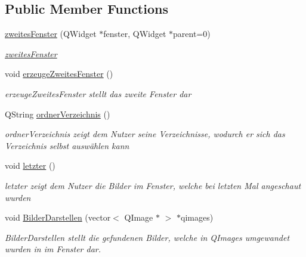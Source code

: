 \subsection*{Public Member Functions}
\begin{DoxyCompactItemize}
\item 
\hyperlink{classzweites_fenster_abd42b9f9eda9e42c44dcfa27e3fd11c3}{zweites\+Fenster} (Q\+Widget $\ast$fenster, Q\+Widget $\ast$parent=0)
\begin{DoxyCompactList}\small\item\em \hyperlink{classzweites_fenster}{zweites\+Fenster} \end{DoxyCompactList}\item 
void \hyperlink{classzweites_fenster_acdfb3797a369e96d2680b2d8ca97521b}{erzeuge\+Zweites\+Fenster} ()\hypertarget{classzweites_fenster_acdfb3797a369e96d2680b2d8ca97521b}{}\label{classzweites_fenster_acdfb3797a369e96d2680b2d8ca97521b}

\begin{DoxyCompactList}\small\item\em erzeuge\+Zweites\+Fenster stellt das zweite Fenster dar \end{DoxyCompactList}\item 
Q\+String \hyperlink{classzweites_fenster_a2bc52fa49362345f9f06e1826d417c6b}{ordner\+Verzeichnis} ()
\begin{DoxyCompactList}\small\item\em ordner\+Verzeichnis zeigt dem Nutzer seine Verzeichnisse, wodurch er sich das Verzeichnis selbst auswählen kann \end{DoxyCompactList}\item 
void \hyperlink{classzweites_fenster_a8dd94404f1bd6d4188b7685bb5bd2cfc}{letzter} ()\hypertarget{classzweites_fenster_a8dd94404f1bd6d4188b7685bb5bd2cfc}{}\label{classzweites_fenster_a8dd94404f1bd6d4188b7685bb5bd2cfc}

\begin{DoxyCompactList}\small\item\em letzter zeigt dem Nutzer die Bilder im Fenster, welche bei letzten Mal angeschaut wurden \end{DoxyCompactList}\item 
void \hyperlink{classzweites_fenster_aef85325646f4504fd137334f7d7c8eea}{Bilder\+Darstellen} (vector$<$ Q\+Image $\ast$ $>$ $\ast$qimages)
\begin{DoxyCompactList}\small\item\em Bilder\+Darstellen stellt die gefundenen Bilder, welche in Q\+Images umgewandet wurden in im Fenster dar. \end{DoxyCompactList}\end{DoxyCompactItemize}


